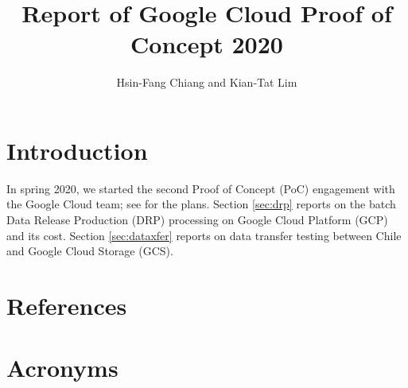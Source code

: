 \documentclass[DM,authoryear,toc,lsstdraft]{lsstdoc}
\title{Report of Google Cloud Proof of Concept 2020}
\author{%
Hsin-Fang Chiang and Kian-Tat Lim
}
\date{\vcsDate}
\begin{document}
\maketitle

\section{Introduction}

In spring 2020, we started the second Proof of Concept (PoC) engagement with the Google Cloud team; see  for the plans.
Section \ref{sec:drp} reports on the batch Data Release Production (DRP) processing on Google Cloud Platform (GCP) and its cost.
Section \ref{sec:dataxfer} reports on data transfer testing between Chile and Google Cloud Storage (GCS).





\appendix
\section{References} \label{sec:bib}
\renewcommand{\refname}{} %


\section{Acronyms} \label{sec:acronyms}

\end{document}
